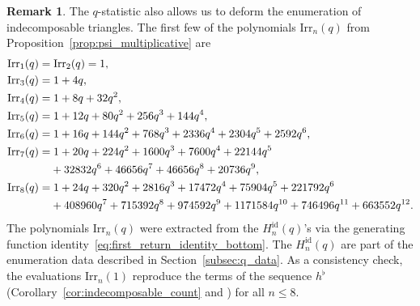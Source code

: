 \documentclass[pdftex]{sigma}
\numberwithin{equation}{section}
\theoremstyle{definition}
\newtheorem{Remark}[Theorem]{Remark}
\begin{document}
\begin{Remark}
	\label{rem:indecomposable_triangles}
	The $q$-statistic also
	allows us to deform the enumeration of indecomposable
	triangles.
	The first few of the polynomials $\mathrm{Irr}_n(q)$ from
	Proposition~\ref{prop:psi_multiplicative} are
	\begin{align*}
			&\mathrm{Irr}_1(q)=\mathrm{Irr}_2(q)=1,\\
			&\mathrm{Irr}_3(q)=1+4q,\\
			&\mathrm{Irr}_4(q)=1+8q+32q^2,\\
			&\mathrm{Irr}_5(q)=1+12q+80q^2+256q^3+144q^4,\\
			&\mathrm{Irr}_6(q)=1+16q+144q^2+768q^3+2336q^4+2304q^5+2592q^6,\\
			&\mathrm{Irr}_7(q)=1+20q+224q^2+1600q^3+7600q^4+22144q^5\\
			&\hphantom{\mathrm{Irr}_7(q)=}{} +32832q^6+46656q^7+46656q^8+20736q^9,\\
			&\mathrm{Irr}_8(q)=1+24q+320q^2+2816q^3+17472q^4+75904q^5+221792q^6\\
			&\hphantom{\mathrm{Irr}_8(q)=}{} +408960q^7+715392q^8+974592q^9+1171584q^{10}+746496q^{11}
			+663552q^{12}.
	\end{align*}
	The polynomials $\mathrm{Irr}_n(q)$ were extracted from the
	$H_n^{\mathrm{id}}(q)$'s via the generating function
	identity~\eqref{eq:first_return_identity_bottom}. The
	$H_n^{\mathrm{id}}(q)$ are part of the enumeration data described in
	Section~\ref{subsec:q_data}.
	As a consistency check, the evaluations $\mathrm{Irr}_n(1)$ reproduce
	the terms of
	the sequence $h^\flat$
	(Corollary~\ref{cor:indecomposable_count} and
	\cite[A362111]{OEIS}) for all $n\le 8$.


\end{Remark}
\end{document}
